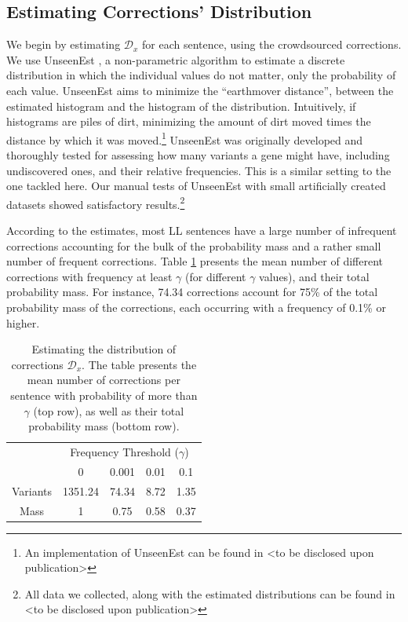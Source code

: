 \documentclass[letterpaper, 11pt]{article}
\newcommand{\com}[1]{}
\begin{document}
\subsection{Estimating Corrections' Distribution}\label{subsec:corrections_distribution}
%
We begin by estimating $\mathcal{D}_x$ for each sentence, using the crowdsourced corrections.
We use {\sc UnseenEst} \cite{zou2015quantifying}, a non-parametric algorithm to
estimate a discrete distribution in which the individual values do not matter, only the probability of each value. {\sc UnseenEst} aims to minimize the ``earthmover distance'', between the estimated histogram and the histogram of the distribution. Intuitively, if histograms are piles of dirt, minimizing the amount of dirt moved times the distance by which it was moved.\footnote{An implementation of {\sc UnseenEst} can be found in <to be disclosed upon publication>\com{\href{https://github.com/borgr/unseenest}}} 
{\sc UnseenEst} was originally developed and thoroughly tested for assessing how many
variants a gene might have, including undiscovered ones, and their relative frequencies.
This is a similar setting to the one tackled here.
Our manual tests of {\sc UnseenEst} with small artificially created datasets
showed satisfactory results.\footnote{All data we collected, along with the estimated
  distributions can be found in <to be disclosed upon publication>}

According to the estimates, most LL sentences have a large number of
infrequent corrections accounting for the bulk of the probability mass
and a rather small number of frequent corrections.
Table \ref{tab:corrections_dist} presents the mean number of different corrections with frequency at least $\gamma$ (for different $\gamma$ values), and their total probability mass.
For instance, 74.34 corrections account for 75\% of the total probability mass of the corrections, each occurring with a frequency of 0.1\% or higher.

\begin{table}[h!]
	\vspace{-0.5cm}
  \centering
  \small
  \singlespacing
  \begin{tabular}{c|c|c|c|c|}
    & \multicolumn{4}{c|}{Frequency Threshold ($\gamma$)}\\ 
    & \multicolumn{1}{c}{0} & \multicolumn{1}{c}{0.001} & \multicolumn{1}{c}{0.01} & \multicolumn{1}{c|}{0.1}
    \\
    \hline
    Variants & 1351.24 & 74.34 & 8.72 & 1.35
    \\
    Mass & 1 & 0.75 & 0.58 & 0.37\\
    \hline
  \end{tabular}
  \caption{\label{tab:corrections_dist}
    Estimating the distribution of corrections $\mathcal{D}_x$.
    The table presents the mean number of corrections per sentence with probability of more than
    $\gamma$ (top row), as well as their total probability mass (bottom row).
  }
  \vspace{-0.3cm}
\end{table}
\end{document}
